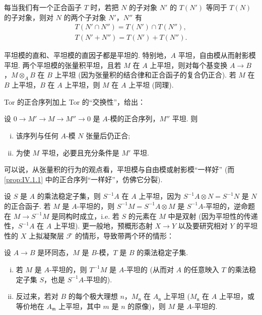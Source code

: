 每当我们有一个正合函子 $T$ 时，若把 $N$ 的子对象 $N'$ 的 $T(N')$ 等同于 $T(N)$ 的子对象，则对 $N$ 的两个子对象 $N'$，$N''$ 有
\[
\begin{array}{l}
T(N' \cap N'') = T(N') \cap T(N''), \\
T(N' + N'') = T(N') + T(N'').
\end{array}
\]

平坦模的直和、平坦模的直因子都是平坦的. 特别地，$A$ 平坦，自由模从而射影模平坦. 两个平坦模的张量积平坦，且若 $M$ 在 $A$ 上平坦，则对每个基变换 $A \to B$，$M \otimes_A B$ 在 $B$ 上平坦 (因为张量积的结合律和正合函子的复合仍正合). 若 $M$ 在 $B$ 上平坦，$B$ 在 $A$ 上平坦，则 $M$ 在 $A$ 上平坦 (同理).

Tor 的正合序列加上 Tor 的``交换性''，给出：

\begin{proposition}\label{prop:IV.1.1}
设 $0 \to M' \to M \to M'' \to 0$ 是 $A$-模的正合序列，$M''$ 平坦. 则
\begin{enumerate}[(i)]
\item 该序列与任何 $A$-模 $N$ 张量后仍正合; 
\item 为使 $M$ 平坦，必要且充分条件是 $M'$ 平坦.
\end{enumerate}
\end{proposition}

可以说，从张量积的行为的观点看，平坦模与自由模或射影模``一样好'' (而 \ref{prop:IV.1.1} 中的正合序列``一样好''，仿佛它分裂).

设 $S$ 是 $A$ 的乘法稳定子集，则 $S^{-1}A$ 在 $A$ 上平坦，因为 $S^{-1}A \otimes N = S^{-1}N$ 是 $N$ 的正合函子. 若 $M$ 是 $A$-平坦的，则 $S^{-1}M = S^{-1}A \otimes M$ 是 $S^{-1}A$-平坦的，逆命题在 $M \to S^{-1}M$ 是同构时成立，i.e. 若 $S$ 的元素在 $M$ 中是双射 (因为平坦性的传递性，$S^{-1}A$ 在 $A$ 上平坦). 更一般地，预概形态射 $X \to Y$ 以及要研究相对 $Y$ 的平坦性的 $X$ 上拟凝聚层 $\mathcal{F}$ 的情形，导致带两个环的情形：

\begin{proposition}\label{prop:IV.1.2}
设 $A \to B$ 是环同态，$M$ 是 $B$-模，$T$ 是 $B$ 的乘法稳定子集.
\begin{enumerate}[(i)]
\item 若 $M$ 是 $A$-平坦的，则 $T^{-1}M$ 是 $A$-平坦的 (从而对 $A$ 的任意映入 $T$ 的乘法稳定子集 $S$，也是 $S^{-1}A$-平坦的).
\item 反过来，若对 $B$ 的每个极大理想 $n$，$M_{\mathfrak{n}}$ 在 $A_{\mathfrak{n}}$ 上平坦 ($M_{\mathfrak{n}}$ 在 $A$ 上平坦，或等价地在 $A_{\mathfrak{m}}$ 上平坦，其中 $m$ 是 $n$ 的原像)，则 $M$ 是 $A$-平坦的.
\end{enumerate}
\end{proposition}

